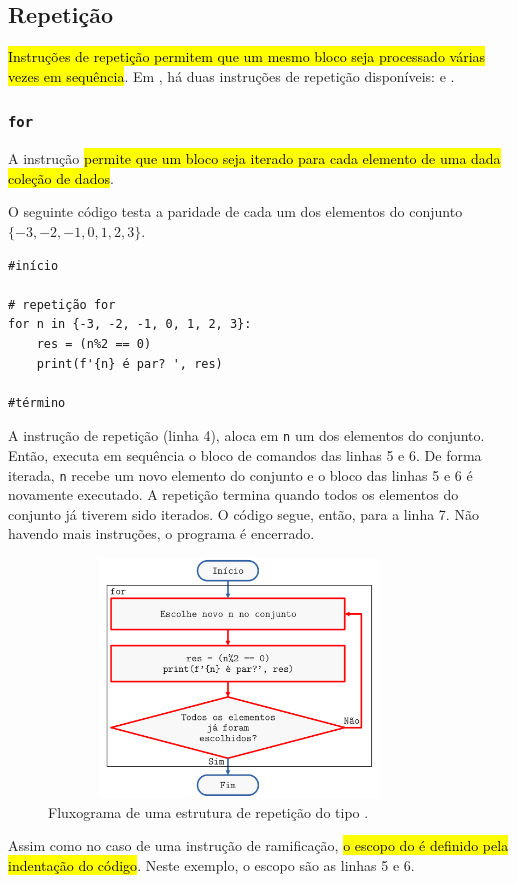\subsection{Repetição}

\hl{Instruções de repetição permitem que um mesmo bloco seja processado várias vezes em sequência}. Em {\python}, há duas instruções de repetição disponíveis: {\PYTHONfor} e {\PYTHONwhile}. 

\subsubsection{\texttt{for}}

A instrução \hl{{\PYTHONfor} permite que um bloco seja iterado para cada elemento de uma dada coleção de dados}.

\begin{ex}\label{cap_progest_sec_est:ex:for}
  O seguinte código testa a paridade de cada um dos elementos do conjunto $\{-3, -2, -1, 0, 1, 2, 3\}$.

\begin{lstlisting}
#início

# repetição for
for n in {-3, -2, -1, 0, 1, 2, 3}:
    res = (n%2 == 0)
    print(f'{n} é par? ', res)
    
#término
\end{lstlisting}

A instrução de repetição {\PYTHONfor} (linha 4), aloca em \lstinline+n+ um dos elementos do conjunto. Então, executa em sequência o bloco de comandos das linhas 5 e 6. De forma iterada, \lstinline+n+ recebe um novo elemento do conjunto e o bloco das linhas 5 e 6 é novamente executado. A repetição termina quando todos os elementos do conjunto já tiverem sido iterados. O código segue, então, para a linha 7. Não havendo mais instruções, o programa é encerrado.

\begin{figure}[H]
  \centering
  \includegraphics[max width=0.9\textwidth, max height=2.5in]{./cap_progest/dados/fig_fg_for/fig.png}
  \caption{Fluxograma de uma estrutura de repetição do tipo {\PYTHONfor}.}
  \label{cap_progest_sec_est:fig:fg_for}
\end{figure}

Assim como no caso de uma instrução de ramificação, \hl{o escopo do {\PYTHONfor} é definido pela indentação do código}. Neste exemplo, o escopo são as linhas 5 e 6.
\end{ex}

